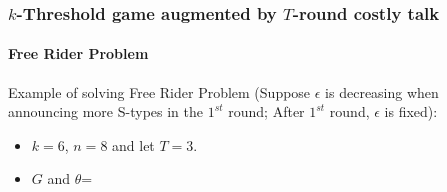 \documentclass[9pt,handout]{beamer}
\begin{document}
\begin{frame}
  \frametitle{$k$-Threshold game augmented by $T$-round costly talk}
  \framesubtitle{Free Rider Problem}
Example of solving Free Rider Problem (Suppose $\epsilon$ \alert{is decreasing} when announcing \alert{more} S-types in the \alert{$1^{st}$} round;  After $1^{st}$ round, $\epsilon$ is fixed):
\begin{itemize}
\item $k=6$, $n=8$ and let $T=3$.
\item $G$ and $\theta$=
\begin{center}
\end{center}
\end{itemize}


\end{frame}
\end{document}
